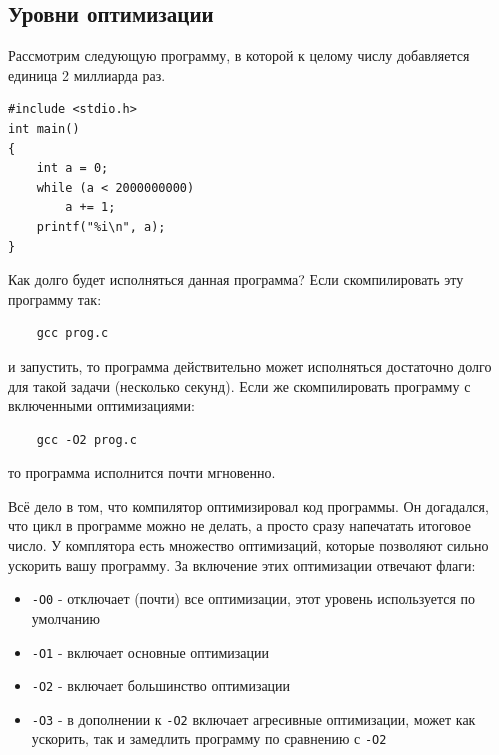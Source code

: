 \documentclass{article}
\begin{document}

\newpage
\subsection*{Уровни оптимизации}
Рассмотрим следующую программу, в которой к целому числу добавляется единица 2 миллиарда раз. 
\begin{lstlisting}
#include <stdio.h>
int main() 
{
	int a = 0;
    while (a < 2000000000)
    	a += 1;
    printf("%i\n", a);
}
\end{lstlisting}
Как долго будет исполняться данная программа? Если скомпилировать эту программу так:
\begin{verbatim}
    gcc prog.c
\end{verbatim}
и запустить, то программа действительно может исполняться достаточно долго для такой задачи (несколько секунд). Если же скомпилировать программу с включенными оптимизациями:
\begin{verbatim}
    gcc -O2 prog.c
\end{verbatim}
то программа исполнится почти мгновенно.

Всё дело в том, что компилятор оптимизировал код программы. Он догадался, что цикл в программе можно не делать, а просто сразу напечатать итоговое число. У комплятора есть множество оптимизаций, которые позволяют сильно ускорить вашу программу. За включение этих оптимизации отвечают флаги:
\begin{itemize}
\item \texttt{-O0} - отключает (почти) все оптимизации, этот уровень используется по умолчанию
\item \texttt{-O1} - включает основные оптимизации
\item \texttt{-O2} - включает большинство оптимизации
\item \texttt{-O3} - в дополнении к \texttt{-O2} включает агресивные оптимизации, может как ускорить, так и замедлить программу по сравнению с \texttt{-O2}
\end{itemize}
\end{document}
